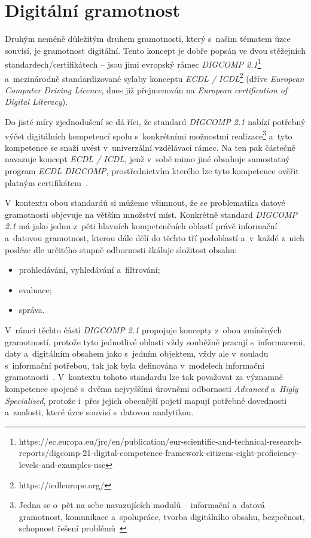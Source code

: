 \hypertarget{digituxe1lnuxed-gramotnost}{%
\section{Digitální gramotnost}\label{digituxe1lnuxed-gramotnost}}

Druhým neméně důležitým druhem gramotnosti, který s~našim tématem úzce souvisí, je gramotnost digitální. Tento koncept je dobře popsán ve dvou stěžejních standardech/certifikátech -- jsou jimi evropský rámec \emph{DIGCOMP 2.1}\footnote{https://ec.europa.eu/jrc/en/publication/eur-scientific-and-technical-research-reports/digcomp-21-digital-competence-framework-citizens-eight-proficiency-levels-and-examples-use} a~mezinárodně standardizované sylaby konceptu \emph{ECDL / ICDL}\footnote{https://icdleurope.org/} (dříve \emph{European Computer Driving Licence}, dnes již přejmenován na \emph{European certification of Digital Literacy}).

Do jisté míry zjednodušení se dá říci, že standard \emph{DIGCOMP 2.1} nabízí potřebný výčet digitálních kompetencí spolu s~konkrétními možnostmi realizace\footnote{Jedna se o~pět na sebe navazujících modulů – informační a~datová gramotnost, komunikace a~spolupráce, tvorba digitálního obsahu, bezpečnost, schopnost řešení problémů~\parencite{digicomp17}} a~tyto kompetence se snaží uvést v~univerzální vzdělávací rámec. Na ten pak částečně navazuje koncept \emph{ECDL / ICDL}, jenž v~sobě mimo jiné obsahuje samostatný program \emph{ECDL DIGCOMP}, prostřednictvím kterého lze tyto kompetence ověřit platným certifikátem~\parencite{chabera21}.

V~kontextu obou standardů si můžeme všimnout, že se problematika datové gramotnosti objevuje na větším množství míst. Konkrétně standard \emph{DIGCOMP 2.1} má jako jednu z~pěti hlavních kompetenčních oblastí právě informační a~datovou gramotnost, kterou dále dělí do těchto tří podoblastí a~v~každé z~nich posléze dle určitého stupně odbornosti škáluje složitost obsahu:

\begin{itemize}
\tightlist
\item
  prohledávání, vyhledávání a~filtrování;
\item
  evaluace;
\item
  správa.
\end{itemize}

V~rámci těchto částí \emph{DIGCOMP 2.1} propojuje koncepty z~obou zmíněných gramotností, protože tyto jednotlivé oblasti vždy souběžně pracují s~informacemi, daty a~digitálním obsahem jako s~jedním objektem, vždy ale v~souladu s~informační potřebou, tak jak byla definována v~modelech informační gramotnosti~\parencite{digicomp17}. V~kontextu tohoto standardu lze tak považovat za významné kompetence spojené s~dvěma nejvyššími úrovněmi odbornosti \emph{Advanced} a~\emph{Higly Specialised}, protože i~přes jejich obecnější pojetí mapují potřebné dovednosti a~znalosti, které úzce souvisí s~datovou analytikou.

